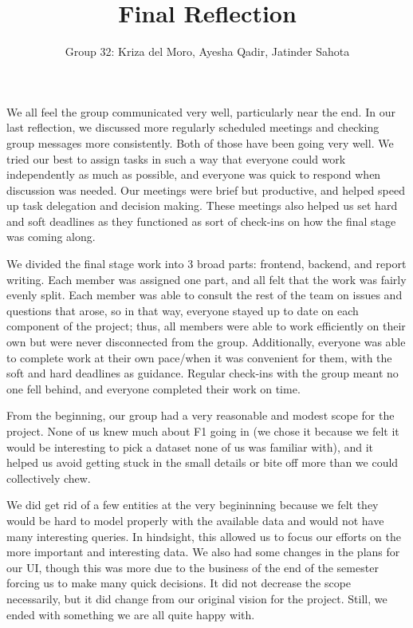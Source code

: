 \documentclass[]{article}
\title{Final Reflection}
\author{Group 32: Kriza del Moro, Ayesha Qadir, Jatinder Sahota}
\begin{document}
\maketitle

We all feel the group communicated very well, particularly near the end. In our last reflection, we discussed more regularly scheduled meetings and checking group messages more consistently. Both of those have been going very well. We tried our best to assign tasks in such a way that everyone could work independently as much as possible, and everyone was quick to respond when discussion was needed. Our meetings were brief but productive, and helped speed up task delegation and decision making. These meetings also helped us set hard and soft deadlines as they functioned as sort of check-ins on how the final stage was coming along.

We divided the final stage work into 3 broad parts: frontend, backend, and report writing. Each member was assigned one part, and all felt that the work was fairly evenly split. Each member was able to consult the rest of the team on issues and questions that arose, so in that way, everyone stayed up to date on each component of the project; thus, all members were able to work efficiently on their own but were never disconnected from the group. Additionally, everyone was able to complete work at their own pace/when it was convenient for them, with the soft and hard deadlines as guidance. Regular check-ins with the group meant no one fell behind, and everyone completed their work on time.

From the beginning, our group had a very reasonable and modest scope for the project. None of us knew much about F1 going in (we chose it because we felt it would be interesting to pick a dataset none of us was familiar with), and it helped us avoid getting stuck in the small details or bite off more than we could collectively chew.

We did get rid of a few entities at the very begininning because we felt they would be hard to model properly with the available data and would not have many interesting queries. In hindsight, this allowed us to focus our efforts on the more important and interesting data. We also had some changes in the plans for our UI, though this was more due to the business of the end of the semester forcing us to make many quick decisions. It did not decrease the scope necessarily, but it did change from our original vision for the project. Still, we ended with something we are all quite happy with.
\end{document}
